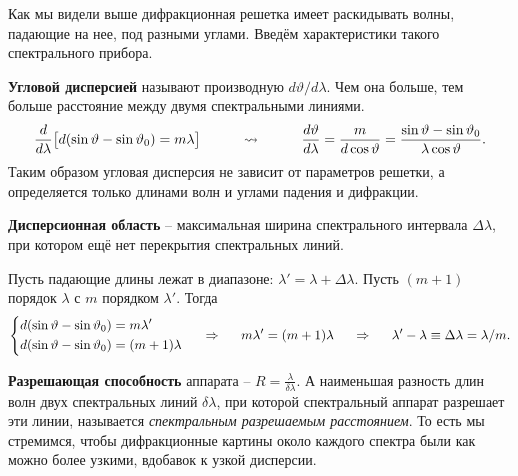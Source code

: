 
Как мы видели выше дифракционная решетка имеет раскидывать волны, падающие на нее, под разными углами. Введём характеристики такого спектрального прибора.

\textbf{Угловой дисперсией} называют производную $d \vartheta/ d \lambda$. Чем она больше, тем больше расстояние между двумя спектральными линиями.
\begin{equation*}
	\frac{d}{d \lambda} \big[ d (\sin \vartheta - \sin \vartheta_0) = m \lambda \big]
	\hspace{1 cm}
	\leadsto
	\hspace{1 cm}
	\frac{d \vartheta}{d \lambda} = \frac{m}{d \cos \vartheta} = \frac{\sin \vartheta  - \sin \vartheta_0}{\lambda \cos \vartheta}.
\end{equation*}
Таким образом угловая дисперсия не зависит от параметров решетки, а определяется только длинами волн и углами падения и дифракции.

\textbf{Дисперсионная область} -- максимальная ширина спектрального интервала $\Delta \lambda$, при котором ещё нет перекрытия спектральных линий.

Пусть падающие длины лежат в диапазоне: $\lambda' = \lambda + \Delta \lambda$. Пусть $(m+1)$ порядок $\lambda$ с $m$ порядком  $\lambda'$.
Тогда
\begin{equation*}
	\left\{
	\begin{aligned}
		&d (\sin \vartheta - \sin \vartheta_0) = m \lambda'\\
		&d (\sin \vartheta - \sin \vartheta_0) = (m+1) \lambda	
	\end{aligned}
	\right.
	\hspace{0.5 cm}
	\Rightarrow
	\hspace{0.5 cm}
	m \lambda' = (m+1) \lambda
	\hspace{0.5 cm}
	\Rightarrow
	\hspace{0.5 cm}
	\lambda' - \lambda \equiv \Delta \lambda = \lambda/m.
\end{equation*}

\textbf{Разрешающая способность} аппарата -- $R = \frac{\lambda}{\delta \lambda}$. А наименьшая разность длин волн двух спектральных линий $\delta\lambda$, при которой спектральный аппарат разрешает эти линии, называется \textit{спектральным разрешаемым расстоянием}.
То есть мы стремимся, чтобы дифракционные картины около каждого спектра были как можно более узкими, вдобавок к узкой дисперсии.

